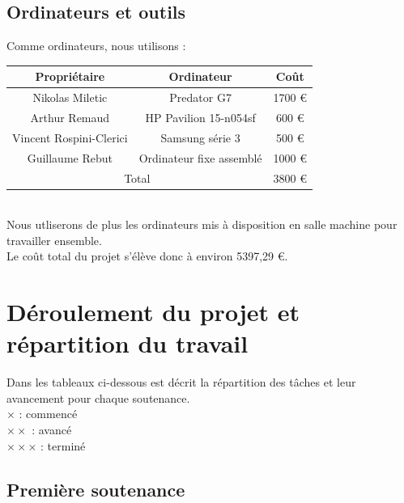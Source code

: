 \documentclass[10pt, titlepage]{report}
\begin{document}
\section{Ordinateurs et outils}

Comme ordinateurs, nous utilisons :\\

\begin{tabular}{|c|c|c|}
\hline
Propriétaire & Ordinateur & Coût\\
\hline
Nikolas Miletic & Predator G7 & 1700 \euro\\
\hline
Arthur Remaud & HP Pavilion 15-n054sf & 600 \euro\\
\hline
Vincent Rospini-Clerici & Samsung série 3 & 500 \euro\\
\hline
Guillaume Rebut & Ordinateur fixe assemblé & 1000 \euro\\
\hline
\multicolumn{2}{|c|}{Total } & 3800 \euro\\
\hline
\end{tabular}\\
Nous utliserons de plus les ordinateurs mis à disposition en salle machine pour travailler ensemble.\\

Le coût total du projet s'élève donc à environ 5397,29 \euro.

\chapter{Déroulement du projet et répartition du travail}

Dans les tableaux ci-dessous est décrit la répartition des tâches et leur avancement pour chaque soutenance.\\
$\times$ : commencé\\
$\times \times$ : avancé\\
$\times \times \times$ : terminé

\section{Première soutenance}
\end{document}
